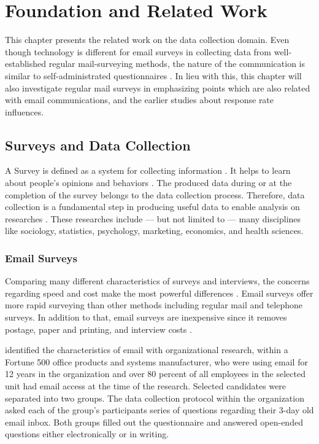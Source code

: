 \chapter{Foundation and Related Work}
\label{chp:FouRelWor}
This chapter presents the related work on the data collection domain. Even though technology is different for email surveys in collecting data from well-established regular mail-surveying methods, the nature of the communication is similar to self-administrated questionnaires \citep{Schaefer1998}. In lieu with this, this chapter will also investigate regular mail surveys in emphasizing points which are also related with email communications, and the earlier studies about response rate influences.

\section{Surveys and Data Collection}
\label{sec:1:SurDatCol}
A Survey is defined as a system for collecting information \citep[page 3]{Sue2011}. It helps to learn about people's opinions and behaviors \citep{DillmanDonA.SmythJoleneD.Christian2009}. The produced data during or at the completion of the survey belongs to the data collection process. Therefore, data collection is a fundamental step in producing useful data to enable analysis on researches \citep[page 149]{Groves2009}. These researches include --- but not limited to --- many disciplines like sociology, statistics, psychology, marketing, economics, and health sciences. 

\subsection{Email Surveys}
\label{sec:2.1.1:EmaSur}

Comparing many different characteristics of surveys and interviews, the concerns regarding speed and cost make the most powerful differences \citep{Sproull1986, Schaefer1998}. Email surveys offer more rapid surveying than other methods including regular mail and telephone surveys. In addition to that, email surveys are inexpensive since it removes postage, paper and printing, and interview costs \citep{Schaefer1998}.
\vspace{1cm}

\cite{Sproull1986} identified the characteristics of email with organizational research, within a Fortune 500 office products and systems manufacturer, who were using email for 12 years in the organization and over 80 percent of all employees in the selected unit had email access at the time of the research. Selected candidates were separated into two groups. The data collection protocol within the organization asked each of the group's participants series of questions regarding their 3-day old email inbox. Both groups filled out the questionnaire and answered open-ended questions either electronically or in writing.
\vspace{1cm}

